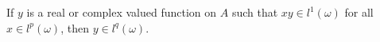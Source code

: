 If $y$ is a real or complex valued function on $A$ such that $xy \in l^1(\omega)$ for all $x \in l^p(\omega)$, then $y \in l^q(\omega)$.
